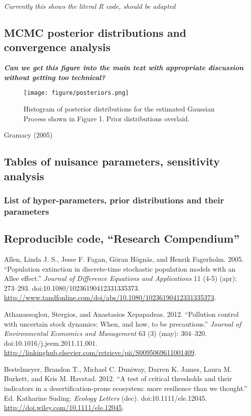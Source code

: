 \documentclass[author-year, review]{elsarticle} %
\makeatletter
\def\maxwidth{\ifdim\Gin@nat@width>\linewidth\linewidth
\else\Gin@nat@width\fi}
\let\Oldincludegraphics\includegraphics
\renewcommand{\includegraphics}[1]{\Oldincludegraphics[width=\maxwidth]{#1}}
\makeatother
\begin{document}
\emph{Currently this shows the literal R code, should be adapted}

\subsection{MCMC posterior distributions and convergence analysis}

\textbf{\emph{Can we get this figure into the main text with appropriate
discussion without getting too technical?}}

\begin{figure}[htbp]
\centering
\texttt{[image: figure/posteriors.png]}
\caption{Histogram of posterior distributions for the estimated Gaussian
Process shown in Figure 1. Prior distributions overlaid.}
\end{figure}

Gramacy (2005)

\subsection{Tables of nuisance parameters, sensitivity analysis}

\subsubsection{List of hyper-parameters, prior distributions and their
parameters}

\subsection{Reproducible code, ``Research Compendium''}

Allen, Linda J. S., Jesse F. Fagan, Göran Högnäs, and Henrik Fagerholm.
2005. ``Population extinction in discrete-time stochastic population
models with an Allee effect.'' \emph{Journal of Difference Equations and
Applications} 11 (4-5) (apr): 273--293.
doi:10.1080/10236190412331335373.
\url{http://www.tandfonline.com/doi/abs/10.1080/10236190412331335373}.

Athanassoglou, Stergios, and Anastasios Xepapadeas. 2012. ``Pollution
control with uncertain stock dynamics: When, and how, to be
precautious.'' \emph{Journal of Environmental Economics and Management}
63 (3) (may): 304--320. doi:10.1016/j.jeem.2011.11.001.
\url{http://linkinghub.elsevier.com/retrieve/pii/S0095069611001409}.

Bestelmeyer, Brandon T., Michael C. Duniway, Darren K. James, Laura M.
Burkett, and Kris M. Havstad. 2012. ``A test of critical thresholds and
their indicators in a desertification-prone ecosystem: more resilience
than we thought.'' Ed. Katharine Suding. \emph{Ecology Letters} (dec).
doi:10.1111/ele.12045. \url{http://doi.wiley.com/10.1111/ele.12045}.
\end{document}
